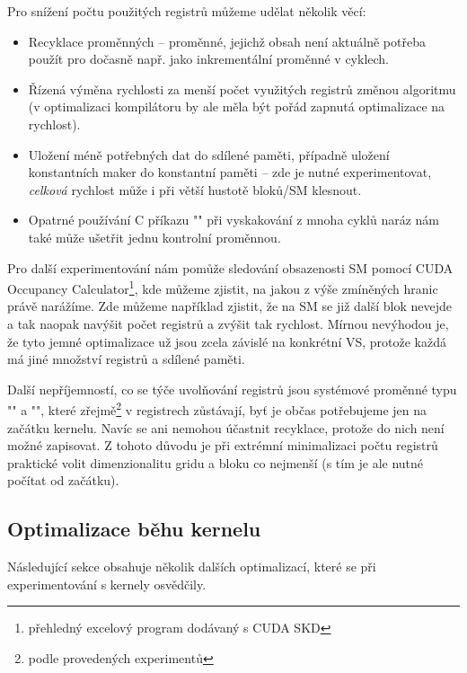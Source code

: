         Pro snížení počtu použitých registrů můžeme udělat několik věcí:
        \begin{itemize}
          \item Recyklace proměnných -- proměnné, jejichž obsah není aktuálně potřeba použít pro dočasně např. jako inkrementální proměnné v cyklech.
          \item Řízená výměna rychlosti za menší počet využitých registrů změnou algoritmu (v optimalizaci kompilátoru by ale měla být pořád zapnutá optimalizace na rychlost).
          \item Uložení méně potřebných dat do sdílené paměti, případně uložení konstantních maker do konstantní paměti -- zde je nutné experimentovat, \emph{celková} rychlost může i při větší hustotě bloků/SM klesnout.
          \item Opatrné používání C příkazu \Vr"" při vyskakování z mnoha cyklů naráz nám také může ušetřit jednu kontrolní proměnnou.
        \end{itemize}

        Pro další experimentování nám pomůže sledování obsazenosti SM pomocí CUDA Occupancy Calculator\footnote{přehledný excelový program dodávaný s CUDA SKD}, kde můžeme zjistit, na jakou z výše zmíněných hranic právě narážíme. Zde můžeme například zjistit, že na SM se již další blok nevejde a tak naopak navýšit počet registrů a zvýšit tak rychlost. Mírnou nevýhodou je, že tyto jemné optimalizace už jsou zcela závislé na konkrétní VS, protože každá má jiné množství registrů a sdílené paměti.

        Další nepříjemností, co se týče uvolňování registrů jsou systémové proměnné typu \Vr"" a \Vr"", které zřejmě\footnote{podle provedených experimentů} v registrech zůstávají, byť je občas potřebujeme jen na začátku kernelu. Navíc se ani nemohou účastnit recyklace, protože do nich není možné zapisovat. Z tohoto důvodu je při extrémní minimalizaci počtu registrů praktické volit dimenzionalitu gridu a bloku co nejmenší (s tím je ale nutné počítat od začátku).
        
    \subsection{Optimalizace běhu kernelu}

    Následující sekce obsahuje několik dalších optimalizací, které se při experimentování s kernely osvědčily. 

